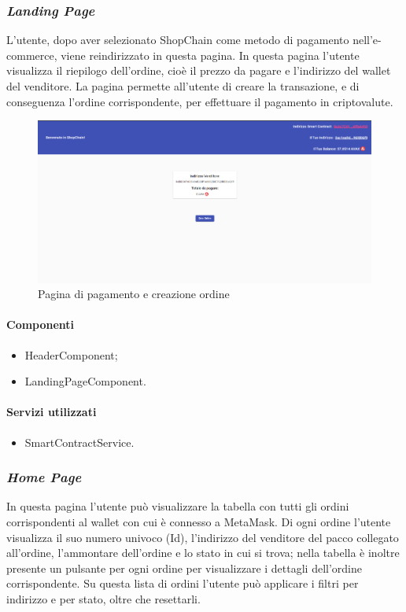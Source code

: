 \subsubsection*{\textit{Landing Page}}
L'utente, dopo aver selezionato ShopChain come metodo di pagamento nell'e-commerce, viene reindirizzato in questa pagina. In questa pagina l'utente visualizza il riepilogo dell'ordine, cioè il prezzo da pagare e l'indirizzo del wallet del venditore. La pagina permette all'utente di creare la transazione, e di conseguenza l'ordine corrispondente, per effettuare il pagamento in criptovalute.

\begin{figure}[!h] 
    \centering 
    \includegraphics[width=1\columnwidth]{immagini/maschere/landingpage.png} 
    \caption{Pagina di pagamento e creazione ordine}
\end{figure}

\paragraph{Componenti}
\begin{itemize}
    \item HeaderComponent;
    \item LandingPageComponent.
\end{itemize}

\paragraph{Servizi utilizzati}
\begin{itemize}
    \item SmartContractService.
\end{itemize}

\newpage

\subsubsection*{\textit{Home Page}}
In questa pagina l'utente può visualizzare la tabella con tutti gli ordini corrispondenti al wallet con cui è connesso a MetaMask. Di ogni ordine l'utente visualizza il suo numero univoco (Id), l'indirizzo del venditore del pacco collegato all'ordine, l'ammontare dell'ordine e lo stato in cui si trova; nella tabella è inoltre presente un pulsante per ogni ordine per visualizzare i dettagli dell'ordine corrispondente. Su questa lista di ordini l'utente può applicare i filtri per indirizzo e per stato, oltre che resettarli.

